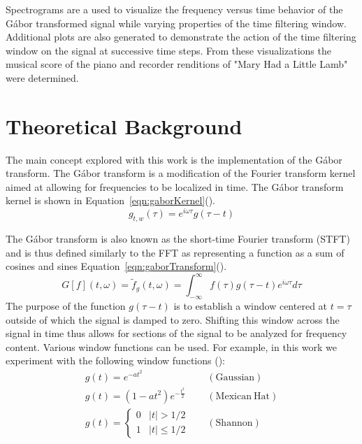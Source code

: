 \documentclass{article}
\begin{document}
Spectrograms are a used to visualize the frequency versus time behavior of the G\'abor transformed signal while varying properties of the time filtering window. Additional plots are also generated to demonstrate the action of the time filtering window on the signal at successive time steps. From these visualizations the musical score of the piano and recorder renditions of "Mary Had a Little Lamb" were determined.

\section{Theoretical Background}
The main concept explored with this work is the implementation of the G\'abor transform. The G\'abor transform is a modification of the Fourier transform kernel aimed at allowing for frequencies to be localized in time. The G\'abor transform kernel is shown in Equation~\ref{eqn:gaborKernel}(\cite{kutz_2013}).
\begin{equation}
g_{t,w}(\tau) = e^{i\omega\tau}g(\tau - t)
    \label{eqn:gaborKernel}
\end{equation}

The G\'abor transform is also known as the short-time Fourier transform (STFT) and is thus defined similarly to the FFT as representing a function as a sum of cosines and sines Equation~\ref{eqn:gaborTransform}(\cite{kutz_2013}).
\begin{equation}
    G[f](t,\omega) = \tilde{f}_{g}(t,\omega) = \int_{-\infty}^{\infty}f(\tau)g(\tau - t)e^{i\omega\tau}d\tau
    \label{eqn:gaborTransform}
\end{equation}
The purpose of the function $g(\tau - t)$ is to establish a window centered at $t = \tau$ outside of which the signal is damped to zero. Shifting this window across the signal in time thus allows for sections of the signal to be analyzed for frequency content. Various window functions can be used. For example, in this work we experiment with the following window functions (\cite{kutz_2013}):
\begin{align}
    g(t) = e^{-at^2} &\quad \mathrm{(Gaussian)} \\
	g(t) = (1 - at^{2})e^{-\frac{t^{2}}{2}} &\quad \mathrm{(Mexican~Hat)} \\
	g(t) = 
				\begin{cases}
					0 & |t|>1/2 \\
					1 & |t|\leq 1/2
				\end{cases}	&\quad \mathrm{(Shannon)}
\end{align}
\end{document}
